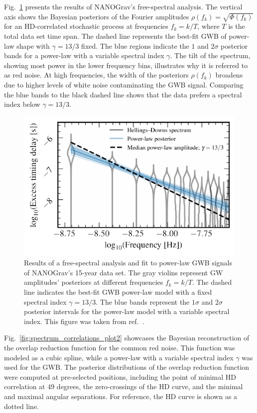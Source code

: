 Fig.~\ref{fig:spectrum_correlations_plot} presents the results of \ac{NANOGrav}’s free-spectral analysis. The vertical axis shows the Bayesian posteriors of the Fourier amplitudes $\rho(f_k) = \sqrt{\Phi(f_k)}$ for an \ac{HD}-correlated stochastic process at frequencies $f_k = k/T$, where $T$ is the total data set  time span. The dashed line represents the best-fit \ac{GWB} of power-law shape with $\gamma = 13/3$ fixed. The blue regions indicate the $1$ and $2\sigma$ posterior bands for a power-law with a variable spectral index $\gamma$. The tilt of the spectrum, showing most power in the lower frequency bins, illustrates why it is referred to as red noise. At high frequencies, the width of the posteriors $\rho(f_k)$ broadens due to higher levels of white noise contaminating the \ac{GWB} signal. Comparing the blue bands to the black dashed line shows that the data prefers a spectral index below $\gamma = 13/3$.

\begin{figure}[t]
	\centering
	\includegraphics[width=.8\columnwidth]{thesisplots/ng15/nano15_hd_freespec_fig1}
	\caption{Results of a free-spectral analysis and fit to power-law \ac{GWB} signals of \ac{NANOGrav}’s 15-year data set. The gray violins represent \ac{GW} amplitudes' posteriors at different frequencies $f_k = k / T$. The dashed line indicates the best-fit \ac{GWB} power-law model with a fixed spectral index $\gamma = 13/3$. The blue bands represent the $1\sigma$ and $2\sigma$ posterior intervals for the power-law model with a variable spectral index. This figure was taken from ref.~\cite{NANOGrav:2023gor}.
		\label{fig:spectrum_correlations_plot}}
\end{figure}

Fig.~\ref{fig:spectrum_correlations_plot2} showcases the Bayesian reconstruction of the overlap reduction function for the common red noise. This function was modeled as a cubic spline, while a power-law with a variable spectral index $\gamma$ was used for the \ac{GWB}. The posterior  distributions of the overlap reduction function were computed at pre-selected positions, including the point of minimal \ac{HD} correlation at 49 degrees, the zero-crossings of the \ac{HD} curve, and the minimal and maximal angular separations. For reference, the \ac{HD} curve is shown as a dotted line.

